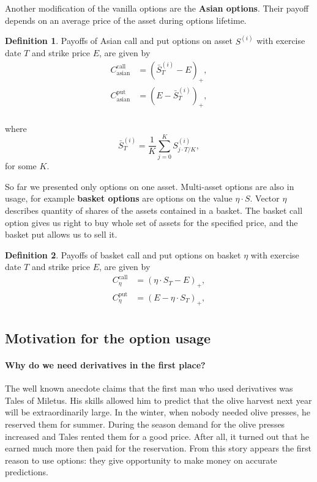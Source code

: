 \documentclass[a4paper,11pt, twoside]{book}
\theoremstyle{definition}
\newtheorem{mydef}{Definition}[chapter]
\theoremstyle{remark}
\newcounter{example}[chapter]
\begin{document}
Another modification of the vanilla options are the \textbf{Asian options}. Their payoff depends on an average price of the asset during options lifetime.
\begin{mydef}
 Payoffs of Asian call and put options on asset $S^{(i)}$ with exercise date $T$ and strike price $E$, are given by
\begin{align*}
 C^{\text{call}}_{\text{asian}} &= (\bar{S}^{(i)}_T - E)_+, \\
 C^{\text{put}}_{\text{asian}} &= (E - \bar{S}^{(i)}_T)_+, \\
\end{align*}
\end{mydef}
\noindent where
\[ \bar{S}^{(i)}_T = \frac{1}{K} \sum\limits_{j=0}^K S^{(i)}_{j\cdot T/K}, \]
for some $K$. 

So far we presented only options on one asset. Multi-asset options are also in usage, for example \textbf{basket options} are options on the value $\eta \cdot S$. Vector $\eta$ describes quantity of shares of the assets contained in a basket. The basket call option gives us right to buy whole set of assets for the specified price, and the basket put allows us to sell it.
\begin{mydef}
 Payoffs of basket call and put options on basket $\eta$ with exercise date $T$ and strike price $E$, are given by
\begin{align*}
 C^{\text{call}}_{\eta} &= (\eta \cdot S_T - E)_+, \\
 C^{\text{put}}_{\eta} &= (E - \eta \cdot S_T)_+, \\
\end{align*}
\end{mydef}

\subsection{Motivation for the option usage}

\paragraph{Why do we need derivatives in the first place?}
The well known anecdote claims that the first man who used derivatives was Tales of Miletus. His skills allowed him to predict that the olive harvest next year will be extraordinarily large. In the winter, when nobody needed olive presses, he reserved them for summer. During the season demand for the olive presses increased and Tales rented them for a good price. After all, it turned out that he earned much more then paid for the reservation. From this story appears the first reason to use options: they give opportunity to make money on accurate predictions.
\end{document}
